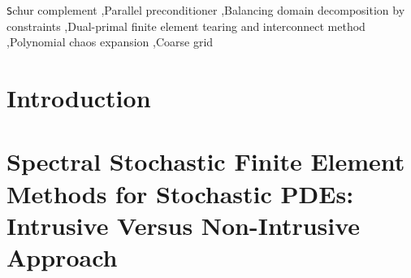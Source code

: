 \documentclass[letter,1p,11pt,oneside,onecolumn,sort&compress]{elsarticle}
\begin{document}
\begin{frontmatter}
\begin{keyword}

\texttt
Schur complement \sep Parallel preconditioner \sep Balancing domain decomposition by constraints \sep Dual-primal finite element tearing and interconnect method \sep Polynomial chaos expansion \sep Coarse grid
\end{keyword}

\end{frontmatter}

\linenumbers

\newpage
\section{Introduction}


\section{Spectral Stochastic Finite Element Methods for Stochastic PDEs: Intrusive Versus Non-Intrusive Approach}

\end{document}
